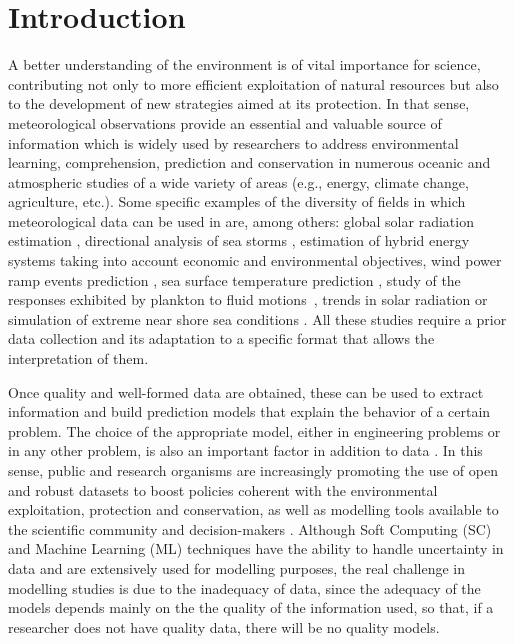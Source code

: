 \documentclass[energies,article,accept,moreauthors,pdftex]{Definitions/mdpi}
\begin{document}


	\section{Introduction}
		
		A better understanding of the environment is of vital importance for science, contributing not only to more efficient exploitation of natural resources but also to the development of new strategies aimed at its protection. In that sense, meteorological observations provide an essential and valuable source of information which is widely used by researchers to address environmental learning, comprehension, prediction and conservation in numerous oceanic and atmospheric studies of a wide variety of areas (e.g., energy, climate change, agriculture, etc.). Some specific examples of the diversity of fields in which meteorological data can be used in are, among others: global solar radiation estimation \cite{SHAHRUKHANIS2019179}, directional analysis of sea storms \cite{LAFACE201545}, estimation of hybrid energy systems taking into account economic and environmental objectives\cite{Kumar2020}, wind power ramp events prediction \cite{DORADOMORENO2017428}, sea surface temperature prediction \cite{He2020}, study of the responses exhibited by plankton to fluid motions~\cite{FUCHS2016109}, trends in solar radiation \cite{SILVA20101852} or simulation of extreme near shore sea conditions \cite{GOULDBY201415}. All these studies require a prior data collection and its adaptation to a specific format that allows the interpretation of them.
		
		Once quality and well-formed data are obtained, these can be used to extract information and build prediction models that explain the behavior of a certain problem. The choice of the appropriate model, either in engineering problems or in any other problem, is also an important factor in addition to data \cite{Alizadeh2019, Alizadeh2020}. {In this sense, public and research organisms are increasingly promoting the use of open and robust datasets to boost policies coherent with the environmental exploitation, protection and conservation, as well as modelling tools available to the scientific community and decision-makers \cite{Manfren2020}}. Although Soft Computing (SC) and Machine Learning (ML) techniques have the ability to handle uncertainty in data and are extensively used for modelling purposes, the real challenge in modelling studies is due to the inadequacy of data, since the adequacy of the models depends mainly on the the quality of the information used, so that, if a researcher does not have quality data, there will be no quality models.
		
\end{document}
